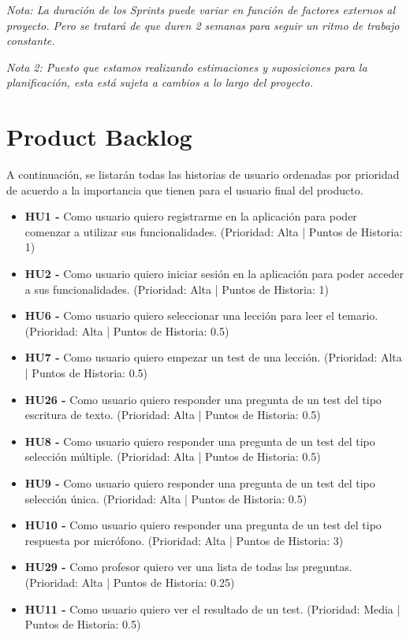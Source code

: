 \textit{Nota: La duración de los Sprints puede variar en función de factores externos al proyecto. Pero se tratará de que duren 2 semanas para seguir un ritmo de trabajo constante.}

\textit{Nota 2: Puesto que estamos realizando estimaciones y suposiciones para la planificación, esta está sujeta a cambios a lo largo del proyecto.}
\section{Product Backlog}
A continuación, se listarán todas las historias de usuario ordenadas por prioridad de acuerdo a la importancia que tienen para el usuario final del producto.
\begin{itemize}
    \item \textbf{HU1 - } Como usuario quiero registrarme en la aplicación para poder comenzar a utilizar sus funcionalidades. (Prioridad: Alta | Puntos de Historia: 1)
    \item \textbf{HU2 - } Como usuario quiero iniciar sesión en la aplicación para poder acceder a sus funcionalidades. (Prioridad: Alta | Puntos de Historia: 1)
    \item \textbf{HU6 - } Como usuario quiero seleccionar una lección para leer el temario. (Prioridad: Alta | Puntos de Historia: 0.5)
    \item \textbf{HU7 - } Como usuario quiero empezar un test de una lección. (Prioridad: Alta | Puntos de Historia: 0.5)
    \item \textbf{HU26 - } Como usuario quiero responder una pregunta de un test del tipo escritura de texto. (Prioridad: Alta | Puntos de Historia: 0.5)
    \item \textbf{HU8 - } Como usuario quiero responder una pregunta de un test del tipo selección múltiple. (Prioridad: Alta | Puntos de Historia: 0.5)
    \item \textbf{HU9 - } Como usuario quiero responder una pregunta de un test del tipo selección única. (Prioridad: Alta | Puntos de Historia: 0.5)
    \item \textbf{HU10 - } Como usuario quiero responder una pregunta de un test del tipo respuesta por micrófono. (Prioridad: Alta | Puntos de Historia: 3)
    \item \textbf{HU29 - } Como profesor quiero ver una lista de todas las preguntas. (Prioridad: Alta | Puntos de Historia: 0.25)
    \item \textbf{HU11 - } Como usuario quiero ver el resultado de un test. (Prioridad: Media | Puntos de Historia: 0.5)

\end{itemize}
